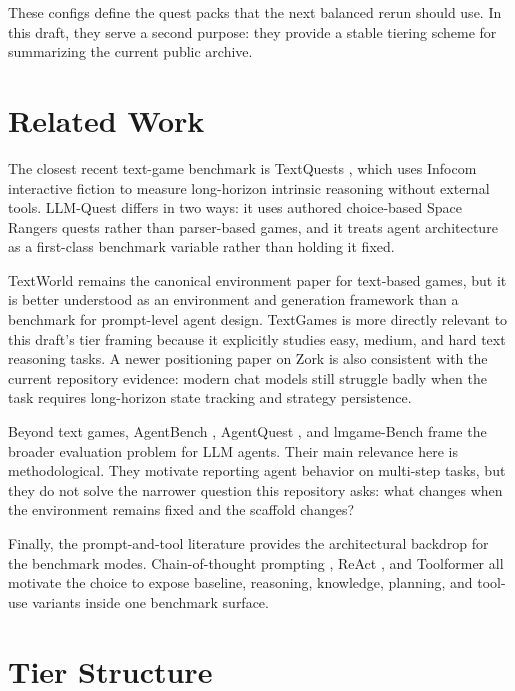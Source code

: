\documentclass[11pt]{article}
\begin{document}
These configs define the quest packs that the next balanced rerun should use. In this draft, they serve a second purpose: they provide a stable tiering scheme for summarizing the current public archive.

\section{Related Work}

The closest recent text-game benchmark is TextQuests \cite{textquests2025}, which uses Infocom interactive fiction to measure long-horizon intrinsic reasoning without external tools. LLM-Quest differs in two ways: it uses authored choice-based Space Rangers quests rather than parser-based games, and it treats agent architecture as a first-class benchmark variable rather than holding it fixed.

TextWorld \cite{textworld2018} remains the canonical environment paper for text-based games, but it is better understood as an environment and generation framework than a benchmark for prompt-level agent design. TextGames \cite{textgames2025} is more directly relevant to this draft's tier framing because it explicitly studies easy, medium, and hard text reasoning tasks. A newer positioning paper on Zork \cite{zork2026} is also consistent with the current repository evidence: modern chat models still struggle badly when the task requires long-horizon state tracking and strategy persistence.

Beyond text games, AgentBench \cite{agentbench2024}, AgentQuest \cite{agentquest2024}, and lmgame-Bench \cite{lmgame2025} frame the broader evaluation problem for LLM agents. Their main relevance here is methodological. They motivate reporting agent behavior on multi-step tasks, but they do not solve the narrower question this repository asks: what changes when the environment remains fixed and the scaffold changes?

Finally, the prompt-and-tool literature provides the architectural backdrop for the benchmark modes. Chain-of-thought prompting \cite{cot2022}, ReAct \cite{react2023}, and Toolformer \cite{toolformer2023} all motivate the choice to expose baseline, reasoning, knowledge, planning, and tool-use variants inside one benchmark surface.

\section{Tier Structure}
\end{document}
